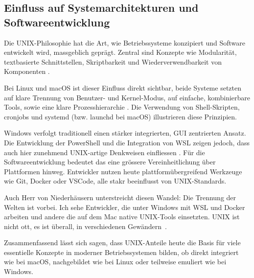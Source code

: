 \subsection{Einfluss auf Systemarchitekturen und Softwareentwicklung}

Die UNIX-Philosophie hat die Art, wie Betriebssysteme konzipiert und Software entwickelt wird, massgeblich geprägt. Zentral sind Konzepte wie Modularität,
textbasierte Schnittstellen, Skriptbarkeit und Wiederverwendbarkeit von Komponenten \cite{ArtOfUnixProgramming}.

Bei Linux und macOS ist dieser Einfluss direkt sichtbar, beide Systeme setzten auf klare Trennung von Benutzer- und Kernel-Modus, auf einfache, kombinierbare Tools,
sowie eine klare Prozesshierarchie \cite{ModernOS, FreeBSDOS}. Die Verwendung von Shell-Skripten, cronjobs und systemd (bzw. launchd bei macOS) illustrieren diese
Prinzipien.

Windows verfolgt traditionell einen stärker integrierten, GUI zentrierten Ansatz. Die Entwicklung der PowerShell und die Integration von WSL zeigen jedoch, dass
auch hier zunehmend UNIX-artige Denkweisen einfliessen \cite{WSL, OSConcept}. Für die Softwareentwicklung bedeutet das eine grössere Vereinheitlichung über
Plattformen hinweg. Entwickler nutzen heute plattformübergreifend Werkzeuge wie Git, Docker oder VSCode, alle stakr beeinflusst von UNIX-Standards.

Auch Herr von Niederhäusern unterstreicht diesen Wandel: \glqq Die Trennung der Welten ist vorbei. Ich sehe Entwickler, die unter Windows mit WSL und Docker
arbeiten und andere die auf dem Mac native UNIX-Tools einsetzten. UNIX ist nicht ott, es ist überall, in verschiedenen Gewändern\grqq \ \cite{interviewNH}.

Zusammenfassend lässt sich sagen, dass UNIX-Anteile heute die Basis für viele essentielle Konzepte in moderner Betriebssystemen bilden, ob direkt integriert wie bei
macOS, nachgebildet wie bei Linux oder teilweise emuliert wie bei Windows.